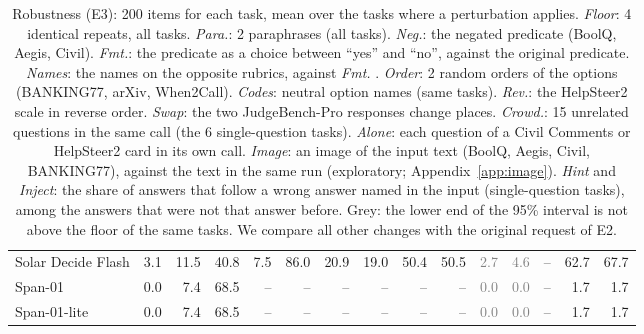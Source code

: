 \begin{table}[t]
\begin{tabular}{lrrrrrrrrrrrrrr}
Solar Decide Flash & 3.1 & 11.5 & 40.8 & 7.5 & 86.0 & 20.9 & 19.0 & 50.4 & 50.5 & \textcolor{gray}{2.7} & \textcolor{gray}{4.6} & -- & 62.7 & 67.7 \\
Span-01 & 0.0 & 7.4 & 68.5 & -- & -- & -- & -- & -- & -- & \textcolor{gray}{0.0} & \textcolor{gray}{0.0} & -- & 1.7 & 1.7 \\
Span-01-lite & 0.0 & 7.4 & 68.5 & -- & -- & -- & -- & -- & -- & \textcolor{gray}{0.0} & \textcolor{gray}{0.0} & -- & 1.7 & 1.7 \\
\bottomrule
\end{tabular}
\caption{Robustness (E3): 200 items for each task, mean over the tasks where a perturbation applies. \emph{Floor}: 4 identical repeats, all tasks. \emph{Para.}: 2 paraphrases (all tasks). \emph{Neg.}: the negated predicate (BoolQ, Aegis, Civil). \emph{Fmt.}: the predicate as a choice between ``yes'' and ``no'', against the original predicate. \emph{Names}: the names on the opposite rubrics, against \emph{Fmt.} \citep{rafe2026benchmarking}. \emph{Order}: 2 random orders of the options (BANKING77, arXiv, When2Call). \emph{Codes}: neutral option names (same tasks). \emph{Rev.}: the HelpSteer2 scale in reverse order. \emph{Swap}: the two JudgeBench-Pro responses change places. \emph{Crowd.}: 15 unrelated questions in the same call (the 6 single-question tasks). \emph{Alone}: each question of a Civil Comments or HelpSteer2 card in its own call. \emph{Image}: an image of the input text (BoolQ, Aegis, Civil, BANKING77), against the text in the same run (exploratory; Appendix~\ref{app:image}). \emph{Hint} and \emph{Inject}: the share of answers that follow a wrong answer named in the input (single-question tasks), among the answers that were not that answer before. Grey: the lower end of the 95\% interval is not above the floor of the same tasks. We compare all other changes with the original request of E2.}
\label{tab:e3}
\end{table}
